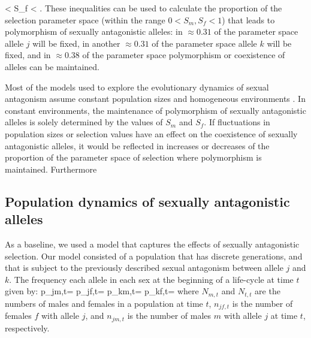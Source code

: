\documentclass[12pt]{article}
\let\oldequation\equation
\let\oldendequation\endequation
\renewenvironment{equation}
  {\linenomathNonumbers\oldequation}
  {\oldendequation\endlinenomath}
\begin{document}
 \begin{equation}
 < S_{f} < 
\label{selection}
 \end{equation}
\citep{kidwell1977regions,pamilo1979genic,connallon_evolutionary_2018}. These inequalities can be used to calculate the proportion of the selection parameter space (within the range $ 0 < S_{m}, S_{f} < 1$) that leads to polymorphism of sexually antagonistic alleles: in $\approx 0.31$ of the parameter space allele $j$ will be fixed, in another $\approx 0.31$ of the parameter space allele $k$ will be fixed, and in $\approx 0.38$ of the parameter space polymorphism or coexistence of alleles can be maintained.

Most of the models used to explore the evolutionary dynamics of sexual antagonism assume constant population sizes and homogeneous environments \citep{kidwell1977regions,pamilo1979genic, immler2012ploidally}. In constant environments, the maintenance of polymorphism of sexually antagonistic alleles is solely determined by the values of $S_{m}$ and $S_{f}$. If fluctuations in population sizes or selection values have an effect on the coexistence of sexually antagonistic alleles, it would be reflected in increases or decreases of the proportion of the parameter space of selection where polymorphism is maintained. Furthermore


\subsection*{Population dynamics of sexually antagonistic alleles}
As a baseline, we used a model that captures the effects of sexually antagonistic selection. Our model consisted of a population that has discrete generations, and that is subject to the previously described sexual antagonism between allele $j$ and $k$. The frequency each allele in each sex at the beginning of a life-cycle at time $t$ given by:
\begin{equation}
    p_{jm,t}= 
    \label{first_pop}
\end{equation}
\begin{equation}
    p_{jf,t}= 
\end{equation}
\begin{equation}
    p_{km,t}= 
\end{equation}
\begin{equation}
    p_{kf,t}= 
\end{equation}
where $N_{m,t}$ and $N_{t,t}$ are the numbers of males and females in a population at time $t$, $n_{jf,t}$ is the number of females $f$ with allele $j$, and $n_{jm,t}$ is the number of males $m$ with allele $j$ at time $t$, respectively.
\end{document}
